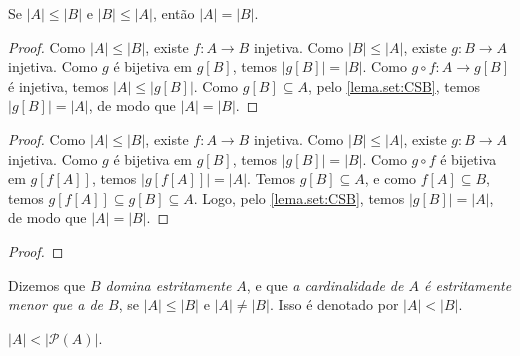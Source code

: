 \begin{theorem} \label{teo.set:CSB}
    Se $|A| \leq |B|$ e $|B| \leq |A|$, então $|A| = |B|$.
\end{theorem}

\begin{proof} 
    Como $|A| \leq |B|$, existe $f : A \to B$ injetiva. Como $|B| \leq |A|$, existe $g : B \to A$ injetiva. Como $g$ é bijetiva em $g[B]$, temos $|g[B]| = |B|$. Como $g \circ f : A \to g[B]$ é injetiva, temos $|A| \leq |g[B]|$. Como $g[B] \subseteq A$, pelo \cref{lema.set:CSB}, temos $|g[B]| = |A|$, de modo que $|A|=|B|$. \blackproof    
\end{proof}

\begin{proof} 
    Como $|A| \leq |B|$, existe $f : A \to B$ injetiva. Como $|B| \leq |A|$, existe $g : B \to A$ injetiva. Como $g$ é bijetiva em $g[B]$, temos $|g[B]| = |B|$. Como $g \circ f$ é bijetiva em $g[f[A]]$, temos $|g[f[A]]| = |A|$. Temos $g[B] \subseteq A$, e como $f[A] \subseteq B$, temos $g[f[A]] \subseteq g[B] \subseteq A$. Logo, pelo \cref{lema.set:CSB}, temos $|g[B]| = |A|$, de modo que $|A| = |B|$. \blackproof
\end{proof}

\begin{proof} 
    
\end{proof}

\begin{definition}
    Dizemos que \emph{$B$ domina estritamente $A$}, e que \emph{a cardinalidade de $A$ é estritamente menor que a de $B$}, se $|A| \leq |B|$ e $|A| \neq |B|$. Isso é denotado por $|A| < |B|$.
\end{definition}

\begin{theorem}[Cantor]
    $|A| < |\mathcal{P}(A)|$.
\end{theorem}

